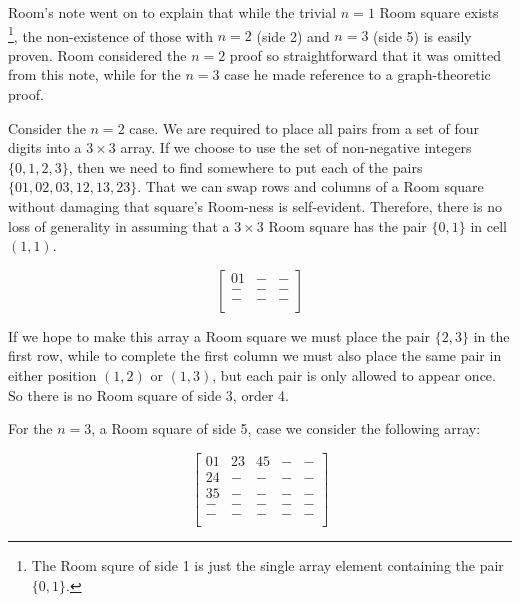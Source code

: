 \documentclass[
  11pt,
  a4paper]{book}\usepackage[]{graphicx}\usepackage[]{xcolor}
\begin{document}
Room’s note went on to explain that while the trivial $n = 1$ Room square exists \footnote{The Room squre of side 1 is just the single array element containing the pair $\{0, 1\}$.}, the non-existence of those with $n = 2$ (side 2) and $n = 3$ (side 5) is easily proven.
Room considered the $n = 2$ proof so straightforward that it was omitted from this note, while for the $n = 3$ case he made reference to a graph-theoretic proof.

Consider the $n = 2$ case.
We are required to place all pairs from a set of four digits into a $3 \times 3$ array.
If we choose to use the set of non-negative integers $\{0, 1, 2, 3\}$, then we need to find somewhere to put each of the pairs $\{01, 02, 03, 12, 13, 23\}$.
That we can swap rows and columns of a Room square without damaging that square’s Room-ness is self-evident.
Therefore, there is no loss of generality in assuming that a $3 \times 3$ Room square has the pair $\{0, 1\}$ in cell $(1, 1)$.

\begin{equation}
  \begin{bmatrix}
    01 &  - & - \\
    -   & - & - \\
    -   & - & - \\
  \end{bmatrix}
\end{equation}

If we hope to make this array a Room square we must place the pair $\{2, 3\}$ in the first row, while to complete the first column we must also place the same pair in either position $(1, 2)$ or $(1, 3)$, but each pair is only allowed to appear once. So there is no Room square of side 3, order 4.

For the $n = 3$, a Room square of side 5, case we consider the following array:

\begin{equation}
  \begin{bmatrix}
    01 & 23 & 45 & - & -  \\
    24 &  - &  - & - & -  \\
    35 &  - &  - & - & -  \\
     - &  - &  - & - & -  \\
     - &  - &  - & - & -  \\
  \end{bmatrix}
\end{equation}
\end{document}
